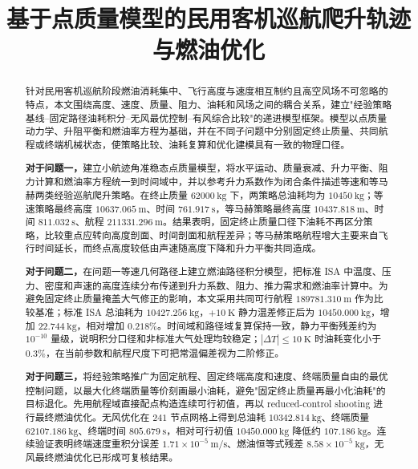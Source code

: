 \documentclass[withoutpreface,bwprint]{cumcmthesis}
\title{基于点质量模型的民用客机巡航爬升轨迹与燃油优化}
\begin{document}

\maketitle

\begin{abstract}
针对民用客机巡航阶段燃油消耗集中、飞行高度与速度相互制约且高空风场不可忽略的特点，本文围绕高度、速度、质量、阻力、油耗和风场之间的耦合关系，建立"经验策略基线--固定路径油耗积分--无风最优控制--有风综合比较"的递进模型框架。模型以点质量动力学、升阻平衡和燃油率方程为基础，并在不同子问题中分别固定终止质量、共同航程或终端机械状态，使策略比较、油耗复算和优化建模具有一致的物理口径。

\textbf{对于问题一，}建立小航迹角准稳态点质量模型，将水平运动、质量衰减、升力平衡、阻力计算和燃油率方程统一到时间域中，并以参考升力系数作为闭合条件描述等速和等马赫两类经验巡航爬升策略。在终止质量 $62000\ \mathrm{kg}$ 下，两策略总油耗均为 $10450\ \mathrm{kg}$；等速策略最终高度 $10637.065\ \mathrm{m}$、时间 $761.917\ \mathrm{s}$，等马赫策略最终高度 $10437.818\ \mathrm{m}$、时间 $811.032\ \mathrm{s}$、航程 $211331.296\ \mathrm{m}$。结果表明，固定终止质量口径下油耗不再区分策略，比较重点应转向高度剖面、时间剖面和航程差异；等马赫策略航程增大主要来自飞行时间延长，而终点高度较低由声速随高度下降和升力平衡共同造成。

\textbf{对于问题二，}在问题一等速几何路径上建立燃油路径积分模型，把标准 ISA 中温度、压力、密度和声速的高度连续分布传递到升力系数、阻力、推力需求和燃油率计算中。为避免固定终止质量掩盖大气修正的影响，本文采用共同可行航程 $189781.310\ \mathrm{m}$ 作为比较基准；标准 ISA 总油耗为 $10427.256\ \mathrm{kg}$，$+10\ \mathrm{K}$ 静力温差修正后为 $10450.000\ \mathrm{kg}$，增加 $22.744\ \mathrm{kg}$，相对增加 $0.218\%$。时间域和路径域复算保持一致，静力平衡残差约为 $10^{-10}$ 量级，说明积分口径和非标准大气处理均较稳定；$|\Delta T|\leq10\ \mathrm{K}$ 时油耗变化小于 $0.3\%$，在当前参数和航程尺度下可把常温偏差视为二阶修正。

\textbf{对于问题三，}将经验策略推广为固定航程、固定终端高度和速度、终端质量自由的最优控制问题，以最大化终端质量等价刻画最小油耗，避免"固定终止质量再最小化油耗"的目标退化。先用航程域直接配点构造连续可行初值，再以 reduced-control shooting 进行最终燃油优化。无风优化在 $241$ 节点网格上得到总油耗 $10342.814\ \mathrm{kg}$、终端质量 $62107.186\ \mathrm{kg}$、终端时间 $805.679\ \mathrm{s}$，相对可行初值 $10450.000\ \mathrm{kg}$ 降低约 $107.186\ \mathrm{kg}$。连续验证表明终端速度重积分误差 $1.71\times10^{-5}\ \mathrm{m/s}$、燃油恒等式残差 $8.58\times10^{-5}\ \mathrm{kg}$，无风最终燃油优化已形成可复核结果。


\end{abstract}
\end{document}
